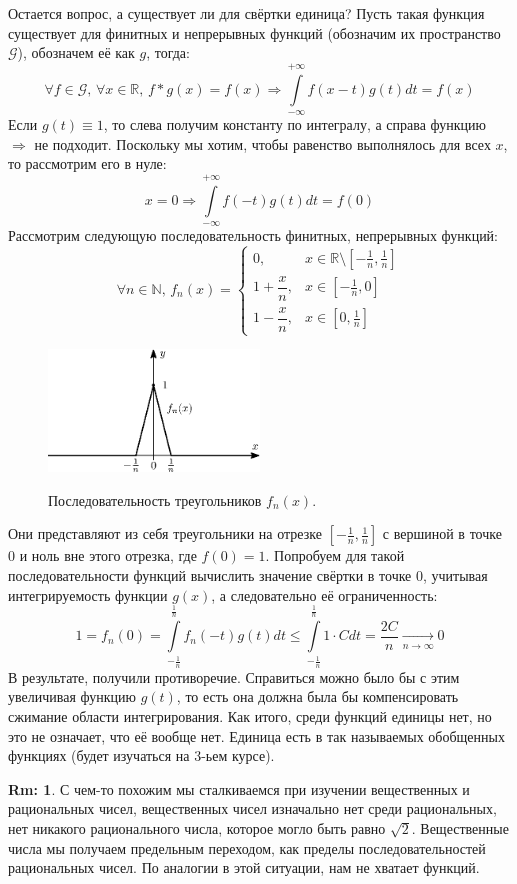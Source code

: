 \documentclass[12pt]{article}
\newcommand{\MR}{\mathbb{R}}
\newcommand{\MN}{\mathbb{N}}
\theoremstyle{definition}
\newtheorem{rem}{Rm:}
\newcommand{\ddint}[2]{\displaystyle\int\limits_{#1}^{#2}}
\begin{document}
Остается вопрос, а существует ли для свёртки единица? Пусть такая функция существует для финитных и непрерывных функций (обозначим их пространство $\mathcal{G}$), обозначем её как $g$, тогда:
$$
	\forall f \in \mathcal{G}, \, \forall x \in \MR, \, f*g(x) = f(x) \Rightarrow \ddint{-\infty}{+\infty}f(x-t)g(t)dt = f(x)
$$
Если $g(t) \equiv 1$, то слева получим константу по интегралу, а справа функцию $\Rightarrow$ не подходит. Поскольку мы хотим, чтобы равенство выполнялось для всех $x$, то рассмотрим его в нуле:
$$
	x = 0 \Rightarrow \ddint{-\infty}{+\infty}f(-t)g(t)dt = f(0)
$$
Рассмотрим следующую последовательность финитных, непрерывных функций:
$$
	\forall n \in \MN, \, f_n(x) = 
	\left\{
		\begin{array}{rl}
			0, & x \in \MR \setminus \left[-\frac{1}{n},\frac{1}{n}\right] \\[10pt]
			1 + \dfrac{x}{n}, & x \in  \left[-\frac{1}{n}, 0\right]\\[10pt]
			1 - \dfrac{x}{n}, & x \in \left[0, \frac{1}{n}\right]
		\end{array}
	\right.
$$
\begin{figure}[H]
	\centering
	\includegraphics[width=0.5\textwidth]{MA3L25_5.eps}
	\label{MA3L25_5}
	\caption{Последовательность треугольников $f_n(x)$.}
	\label{fig: Последовательность треугольников}
\end{figure}
Они представляют из себя треугольники на отрезке $\left[-\frac{1}{n},\frac{1}{n}\right]$ с вершиной в точке $0$ и ноль вне этого отрезка, где $f(0) = 1$. Попробуем для такой последовательности функций вычислить значение свёртки в точке $0$, учитывая интегрируемость функции $g(x)$, а следовательно её ограниченность:
$$
	1 = f_n (0) = \ddint{-\frac{1}{n}}{\frac{1}{n}}f_n(-t)g(t)dt \leq \ddint{-\frac{1}{n}}{\frac{1}{n}}1{\cdot}C dt = \dfrac{2C}{n} \xrightarrow[n \to \infty]{}0
$$
В результате, получили противоречие. Справиться можно было бы с этим увеличивая функцию $g(t)$, то есть она должна была бы компенсировать сжимание области интегрирования. Как итого, среди функций единицы нет, но это не означает, что её вообще нет. Единица есть в так называемых обобщенных функциях (будет изучаться на $3$-ьем курсе). 
\begin{rem}
	С чем-то похожим мы сталкиваемся при изучении вещественных и рациональных чисел, вещественных чисел изначально нет среди рациональных, нет никакого рационального числа, которое могло быть равно $\sqrt{2}$. Вещественные числа мы получаем предельным переходом, как пределы последовательностей рациональных чисел. По аналогии в этой ситуации, нам не хватает функций.
\end{rem}
\end{document}
